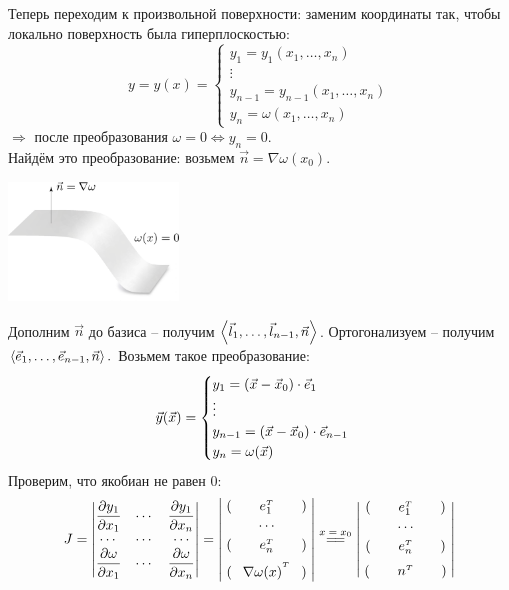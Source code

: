 \documentclass[../main.tex]{subfiles}
\begin{document}
Теперь переходим к произвольной поверхности: заменим координаты так, чтобы локально поверхность была гиперплоскостью:
\[y = y(x) = \begin{cases} y_1 = y_1(x_1,\dots, x_n) \\ \vdots \\ y_{n-1} = y_{n-1}(x_1,\dots,x_n) \\ y_n = \omega(x_1,\dots,x_n) \end{cases} \]
$\Rightarrow$ после преобразования $\omega=0 \Leftrightarrow y_n=0$.\\
Найдём это преобразование: возьмем $\vec{n} = \nabla \omega(x_0)$.
\vspace{0.2em}
\begin{center}
\includegraphics[width=0.34\textwidth]{./pic 2_1.pdf}
\end{center}
\vspace{-0.7em} %
Дополним $\vec{n}$ до базиса -- получим $\left\langle \vec{l}_1,\dots,\vec{l}_{n-1},\vec{n} \right\rangle$. Ортогонализуем -- получим $\left\langle \vec{e}_1,\dots,\vec{e}_{n-1},\vec{n} \right\rangle.$ Возьмем такое преобразование:
\[ \vec{y}(\vec{x}) = \begin{cases} y_1 = \left(\vec{x}-\vec{x}_0\right) \cdot \vec{e}_1 \\ \vdots \\ y_{n-1} = \left(\vec{x}-\vec{x}_0\right) \cdot \vec{e}_{n-1} \\ y_n = \omega(\vec{x}) \end{cases}\]
Проверим, что якобиан не равен 0:
$$
J = \begin{vmatrix} 
\pd{y_1}{x_1} & \cdots & \pd{y_1}{x_n} \\
\cdots &\cdots &\cdots \\
\pd{\omega}{x_1} & \cdots & \pd{\omega}{x_n} \end{vmatrix}
= \begin{vmatrix}
\;(\qquad e_1^\transp \qquad)\;\\[0.2em]
\cdots\\[0.2em]
\;(\qquad e_n^\transp \qquad)\;\\[0.6em]
\;(\;\;\: \nabla\omega(x)^\Transp \;\;\:)\;
\end{vmatrix}
\overset{\text{$x = x_0$}}{=\joinrel=}
\begin{vmatrix}
    \;(\qquad e_1^\transp \qquad)\;\\[0.2em]
    \cdots\\[0.2em]
    \;(\qquad e_n^\transp \qquad)\;\\[0.6em]
    \;(\qquad n^\transp \qquad)\;
    \end{vmatrix}
$$
\end{document}
